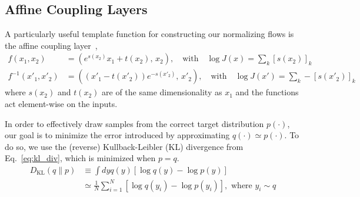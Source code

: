 \documentclass[a4paper,11pt]{article}
\begin{document}
\subsection{\label{subsec:coupling_layers}Affine Coupling Layers}
A particularly useful template function for constructing our normalizing flows
is the affine coupling layer~\cite{DinhSB16,rezende2015variational},
\marginpar{\color{red}[RealNVP]}
%
\begin{align*}
    f(x_{1}, x_{2}) &= \left(e^{s(x_2)}x_{1} + t(x_{2}),\, x_{2}\right),
        \quad\text{with}\quad \log J(x) = \sum_{k}\left[s(x_{2})\right]_{k}\\
    f^{-1}(x'_{1}, x'_{2}) &= \left((x'_{1}-t(x'_{2}))e^{-s(x'_{2})},\, x'_{2}\right),
        \quad\text{with}\quad \log J(x') = \sum_{k}-\left[s(x'_{2})\right]_{k}
\end{align*}
%
where \(s(x_{2})\) and \(t(x_{2})\) are of the same dimensionality as \(x_{1}\)
and the functions act element-wise on the inputs.

In order to effectively draw samples from the correct target distribution
\(p(\cdot)\), our goal is to minimize the error introduced by approximating
\(q(\cdot)\simeq p(\cdot)\).
%
To do so, we use the (reverse) Kullback-Leibler (KL) divergence from
Eq.~\ref{eq:kl_div}, which is minimized when \(p=q\).
\marginpar{\color{red}{[KL-div]}}
%
\begin{align}
    \label{eq:kl_div}
    D_{\mathrm{KL}}(q\|p) 
    &\equiv\int dy q(y)\left[\log q(y) - \log p(y)\right]\\
    &\simeq \frac{1}{N}\sum_{i=1}^{N} \left[\log q(y_{i})-\log p(y_{i})\right],
        \,\,\text{where}\,\, y_{i}\sim q
\end{align}
%
\end{document}
